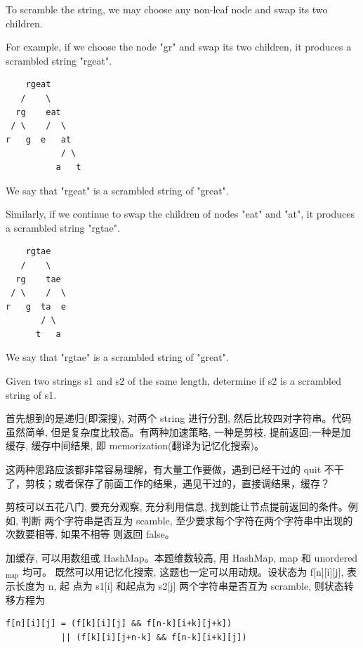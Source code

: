 \documentclass[12pt]{book}
\begin{document}
To scramble the string, we may choose any non-leaf node and swap its two children.

For example, if we choose the node "gr" and swap its two children, it produces a scrambled string "rgeat".

\lstset{language=java,label= ,caption= ,numbers=none}
\begin{lstlisting}
    rgeat
   /    \
  rg    eat
 / \    /  \
r   g  e   at
           / \
          a   t
\end{lstlisting}

We say that "rgeat" is a scrambled string of "great".

Similarly, if we continue to swap the children of nodes "eat" and "at", it produces a scrambled string "rgtae".

\lstset{language=java,label= ,caption= ,numbers=none}
\begin{lstlisting}
    rgtae
   /    \
  rg    tae
 / \    /  \
r   g  ta  e
       / \
      t   a
\end{lstlisting}

We say that "rgtae" is a scrambled string of "great".

Given two strings s1 and s2 of the same length, determine if s2 is a scrambled string of s1.

首先想到的是递归(即深搜), 对两个 string 进行分割, 然后比较四对字符串。代码虽然简单, 
但是复杂度比较高。有两种加速策略, 一种是剪枝, 提前返回;一种是加缓存, 缓存中间结果, 即
memorization(翻译为记忆化搜索)。

这两种思路应该都非常容易理解，有大量工作要做，遇到已经干过的 quit 不干了，剪枝；或者保存了前面工作的结果，遇见干过的，直接调结果，缓存？

剪枝可以五花八门, 要充分观察, 充分利用信息, 找到能让节点提前返回的条件。例如, 判断
两个字符串是否互为 scamble, 至少要求每个字符在两个字符串中出现的次数要相等, 如果不相等
则返回 false。

加缓存, 可以用数组或 HashMap。本题维数较高, 用 HashMap, map 和 unordered$_{\text{map}}$ 均可。
既然可以用记忆化搜索, 这题也一定可以用动规。设状态为 f[n][i][j], 表示长度为 n, 起
点为 s1[i] 和起点为 s2[j] 两个字符串是否互为 scramble, 则状态转移方程为
\lstset{language=java,label= ,caption= ,numbers=none}
\begin{lstlisting}
f[n][i][j] = (f[k][i][j] && f[n-k][i+k][j+k])
           || (f[k][i][j+n-k] && f[n-k][i+k][j])
\end{lstlisting}
\end{document}
